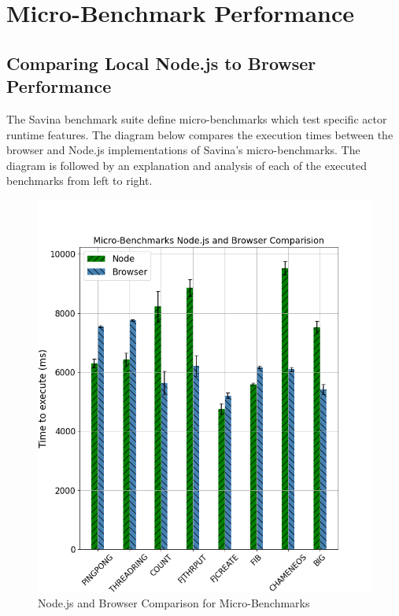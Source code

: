 \documentclass[oneside]{um-fict}
\begin{document}
\section{Micro-Benchmark Performance}\label{section:microbenchmark}
\subsection{Comparing Local Node.js to Browser Performance}
The Savina benchmark suite define micro-benchmarks which test specific actor runtime features. The diagram below compares the execution times between the browser and Node.js implementations of Savina's micro-benchmarks. The diagram is followed by an explanation and analysis of each of the executed benchmarks from left to right.
\begin{figure}[H]
    \begin{centering}
        \includegraphics[width=\textwidth]{resources/micro.png}
        \caption{Node.js and Browser Comparison for Micro-Benchmarks}\label{fig:micro}
    \end{centering}
\end{figure}
\end{document}
